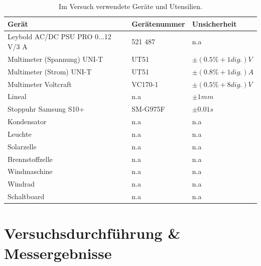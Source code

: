 \documentclass[12pt,a4paper,twoside]{article}
\begin{document}
    \begin{table}[H]
        \centering
        \caption{Im Versuch verwendete Geräte und Utensilien.}
        \label{tab:geraete}
        \begin{tabular}{| l | l | l |}
            \hline
            Gerät  & Gerätenummer  & Unsicherheit \\
            \hline
            Leybold AC/DC PSU PRO 0...12 V/3 A& 521 487 & {n.a} \\
            Multimeter (Spannung) UNI-T & UT51 & $\pm (0.5 \% + 1 dig.)V$ \cite{multimeter1} \\
            Multimeter (Strom) UNI-T & UT51 & $\pm (0.8 \% + 1 dig.)A$  \cite{multimeter1} \\
            Multimeter Voltcraft & VC170-1 & $\pm (0.5 \% + 8 dig.)V$ \cite{multimeter2} \\
            Lineal & {n.a} & $\pm 1mm $ \\
            Stoppuhr Samsung S10+ & SM-G975F & $\pm 0.01s$ \\
            Kondensator & {n.a} & {n.a} \\
            Leuchte & {n.a} & {n.a} \\
            Solarzelle & {n.a} & {n.a} \\
            Brennstoffzelle & {n.a} & {n.a} \\
            Windmaschine & {n.a} & {n.a} \\
            Windrad & {n.a} & {n.a} \\
            Schaltboard & {n.a} & {n.a} \\
            \hline
        \end{tabular}
    \end{table}


\section{Versuchsdurchführung \& Messergebnisse} %
\end{document}
